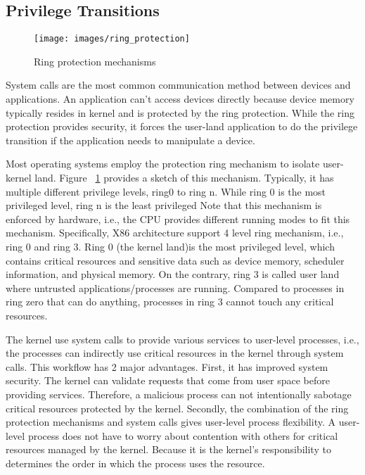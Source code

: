 \subsection{Privilege Transitions}
\begin{figure}[H]
  \centering
  \texttt{[image: images/ring\_protection]}
  \caption[Ring protection mechanisms]{Ring protection mechanisms}
  \label{fig:ring_protection}
\end{figure}
System calls are the most common communication method between devices and applications.  
An application can't access devices directly because device memory typically resides in 
 kernel and is protected by the ring protection.  While the ring protection provides security, 
 it forces the user-land application to do the privilege transition if the application needs to 
 manipulate a device.



 Most operating systems employ the protection ring mechanism\cite{13} to isolate user-kernel land. 
 Figure ~\ref{fig:ring_protection} provides a sketch of this mechanism. Typically, it has multiple different privilege levels, 
 ring0 to ring n. While ring 0 is the most privileged level, ring n is the least privileged
 Note that this mechanism is enforced by hardware, i.e., the CPU provides different running modes 
 to fit this mechanism.  Specifically, X86 architecture support 4 level ring mechanism, i.e., 
 ring 0 and ring 3.  Ring 0 (the kernel land)is the most privileged level, which contains critical 
 resources and sensitive data such as device memory, scheduler information, and physical memory. 
 On the contrary, ring 3 is called user land where untrusted applications/processes are running.  
 Compared to processes in ring zero that can do anything, processes in ring 3 cannot touch any 
 critical resources.


 The kernel use system calls to provide various services to user-level processes, i.e., the processes 
 can indirectly use critical resources in the kernel through system calls. This workflow has 2 major 
 advantages. First, it has improved system security. The kernel can validate requests that come from 
 user space before providing services. Therefore, a malicious process can not intentionally sabotage 
 critical resources protected by the kernel. Secondly, the combination of the ring protection 
 mechanisms and system calls gives user-level process flexibility. A user-level process does not 
 have to worry about contention with others for critical resources managed by the kernel. Because 
 it is the kernel's responsibility to determines the order in which the process uses the resource. 
 

